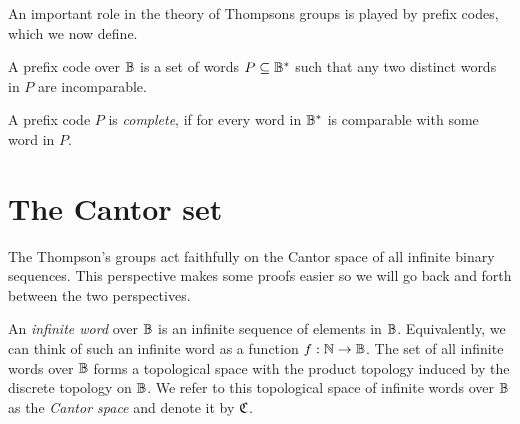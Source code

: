 An important role in the theory of Thompsons groups is played by prefix codes, which we now define.

\begin{definition}%
  \label{def:prefix_code}
  \rocqok{}
  A prefix code over $\mathbb{B}$ is a set of words $P\subseteq \mathbb{B}^\ast$ such that any two distinct
  words in $P$ are incomparable.
\end{definition}

\begin{definition}%
  \label{def:prefix_code_complete}
  A prefix code $P$ is \emph{complete}, if for every word in $\mathbb{B}^\ast$ is comparable with some word in $P$.
\end{definition}


\section{The Cantor set}
The Thompson's groups act faithfully on the Cantor space of all infinite binary sequences. 
This perspective makes some proofs easier so we will go back and forth between the two perspectives.
\begin{definition}\label{def:Cantor_space}
  An \emph{infinite word} over \(\mathbb{B}\) is an infinite sequence of elements in
  $\mathbb{B}$. Equivalently, we can think of such an infinite word as a
  function \(f:{\mathbb{N}}\to \mathbb{B}\).
  The set of all infinite words over $\mathbb{B}$ forms a topological space with the
  product topology induced by the discrete topology on \(\mathbb{B}\).
  We refer to this topological space of infinite words over $\mathbb{B}$ as the
  \emph{Cantor space} and denote it by \(\mathfrak{C}\).
\end{definition}

